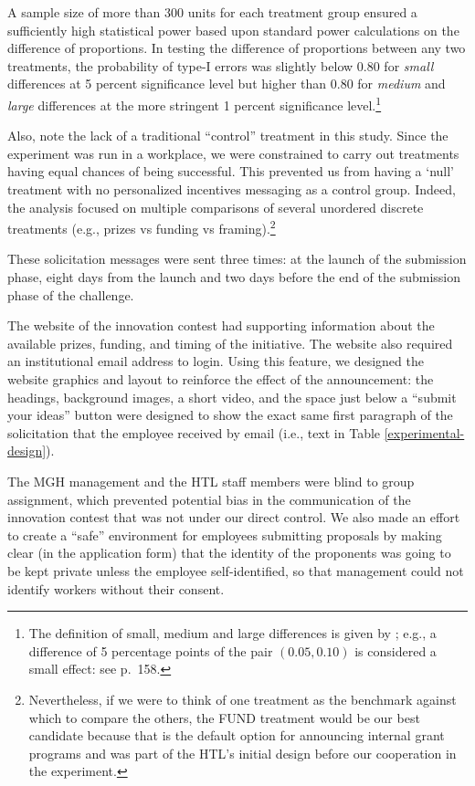 \documentclass[11pt, titlepage]{article}
\begin{document}


A sample size of more than 300 units for each treatment group ensured a
sufficiently high statistical power based upon standard power
calculations on the difference of proportions. In testing the difference
of proportions between any two treatments, the probability of type-I
errors was slightly below \(0.80\) for \emph{small} differences at 5
percent significance level but higher than \(0.80\) for \emph{medium}
and \emph{large} differences at the more stringent 1 percent
significance level.\footnote{The definition of small, medium and large
  differences is given by \citet{cohen1992power}; e.g., a difference of
  5 percentage points of the pair \((0.05, 0.10)\) is considered a small
  effect: see \citet{cohen1992power} p.~158.}

Also, note the lack of a traditional ``control'' treatment in this
study. Since the experiment was run in a workplace, we were constrained
to carry out treatments having equal chances of being successful. This
prevented us from having a `null' treatment with no personalized
incentives messaging as a control group. Indeed, the analysis focused on
multiple comparisons of several unordered discrete treatments (e.g.,
prizes vs funding vs framing).\footnote{Nevertheless, if we were to
  think of one treatment as the benchmark against which to compare the
  others, the FUND treatment would be our best candidate because that is
  the default option for announcing internal grant programs and was part
  of the HTL's initial design before our cooperation in the experiment.}

These solicitation messages were sent three times: at the launch of the
submission phase, eight days from the launch and two days before the end
of the submission phase of the challenge.

The website of the innovation contest had supporting information about
the available prizes, funding, and timing of the initiative. The website
also required an institutional email address to login. Using this
feature, we designed the website graphics and layout to reinforce the
effect of the announcement: the headings, background images, a short
video, and the space just below a ``submit your ideas'' button were
designed to show the exact same first paragraph of the solicitation that
the employee received by email (i.e., text in Table
\ref{experimental-design}).

The MGH management and the HTL staff members were blind to group
assignment, which prevented potential bias in the communication of the
innovation contest that was not under our direct control. We also made
an effort to create a ``safe'' environment for employees submitting
proposals by making clear (in the application form) that the identity of
the proponents was going to be kept private unless the employee
self-identified, so that management could not identify workers without
their consent.
\end{document}
